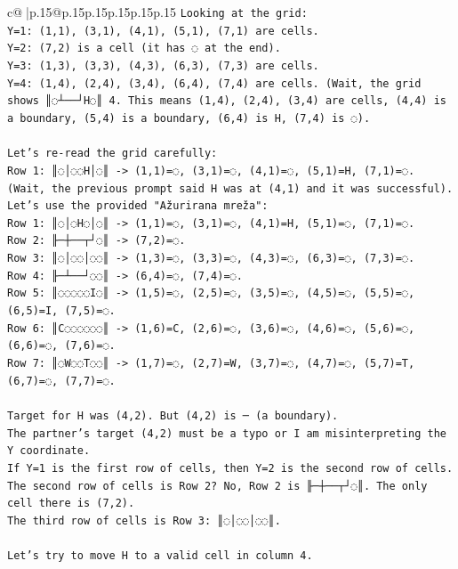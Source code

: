 \documentclass{article}
\begin{document}
{\begin{supertabular}{c@{$\;$}|p{.15\linewidth}@{}p{.15\linewidth}p{.15\linewidth}p{.15\linewidth}p{.15\linewidth}p{.15\linewidth}}
{{{\texttt{Looking at the grid:} \\
\texttt{Y=1: (1,1), (3,1), (4,1), (5,1), (7,1) are cells.} \\
\texttt{Y=2: (7,2) is a cell (it has ◌ at the end).} \\
\texttt{Y=3: (1,3), (3,3), (4,3), (6,3), (7,3) are cells.} \\
\texttt{Y=4: (1,4), (2,4), (3,4), (6,4), (7,4) are cells. (Wait, the grid shows ║◌┴──┘H◌║ 4. This means (1,4), (2,4), (3,4) are cells, (4,4) is a boundary, (5,4) is a boundary, (6,4) is H, (7,4) is ◌).} \\
\\ 
\texttt{Let's re{-}read the grid carefully:} \\
\texttt{Row 1: ║◌│◌◌H│◌║ {-}> (1,1)=◌, (3,1)=◌, (4,1)=◌, (5,1)=H, (7,1)=◌. (Wait, the previous prompt said H was at (4,1) and it was successful).} \\
\texttt{Let's use the provided "Ažurirana mreža":} \\
\texttt{Row 1: ║◌│◌H◌│◌║ {-}> (1,1)=◌, (3,1)=◌, (4,1)=H, (5,1)=◌, (7,1)=◌.} \\
\texttt{Row 2: ╟─┼──┬┘◌║ {-}> (7,2)=◌.} \\
\texttt{Row 3: ║◌│◌◌│◌◌║ {-}> (1,3)=◌, (3,3)=◌, (4,3)=◌, (6,3)=◌, (7,3)=◌.} \\
\texttt{Row 4: ╟─┴──┘◌◌║ {-}> (6,4)=◌, (7,4)=◌.} \\
\texttt{Row 5: ║◌◌◌◌◌I◌║ {-}> (1,5)=◌, (2,5)=◌, (3,5)=◌, (4,5)=◌, (5,5)=◌, (6,5)=I, (7,5)=◌.} \\
\texttt{Row 6: ║C◌◌◌◌◌◌║ {-}> (1,6)=C, (2,6)=◌, (3,6)=◌, (4,6)=◌, (5,6)=◌, (6,6)=◌, (7,6)=◌.} \\
\texttt{Row 7: ║◌W◌◌T◌◌║ {-}> (1,7)=◌, (2,7)=W, (3,7)=◌, (4,7)=◌, (5,7)=T, (6,7)=◌, (7,7)=◌.} \\
\\ 
\texttt{Target for H was (4,2). But (4,2) is ─ (a boundary).} \\
\texttt{The partner's target (4,2) must be a typo or I am misinterpreting the Y coordinate.} \\
\texttt{If Y=1 is the first row of cells, then Y=2 is the second row of cells.} \\
\texttt{The second row of cells is Row 2? No, Row 2 is ╟─┼──┬┘◌║. The only cell there is (7,2).} \\
\texttt{The third row of cells is Row 3: ║◌│◌◌│◌◌║.} \\
\\ 
\texttt{Let's try to move H to a valid cell in column 4.} \\
}}}
\end{supertabular}}
\end{document}
